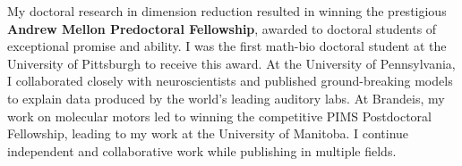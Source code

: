 My doctoral research in dimension reduction resulted in winning the prestigious \textbf{Andrew Mellon Predoctoral Fellowship}, awarded to doctoral students of exceptional promise and ability. I was the first math-bio doctoral student at the University of Pittsburgh to receive this award. At the University of Pennsylvania, I collaborated closely with neuroscientists and published ground-breaking models to explain data produced by the world's leading auditory labs. At Brandeis, my work on molecular motors led to winning the competitive PIMS Postdoctoral Fellowship, leading to my work at the University of Manitoba. I continue independent and collaborative work while publishing in multiple fields.